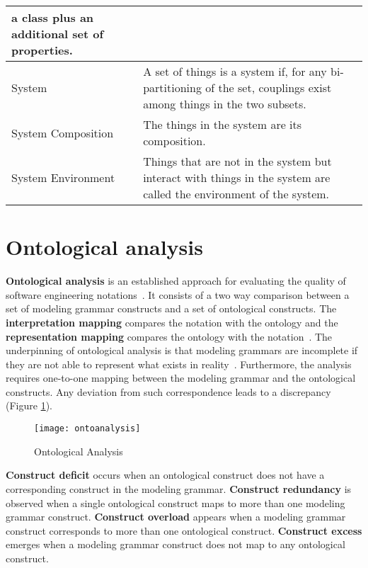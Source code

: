 \begin{center}
\begin{longtable}{ | p{11em} | p{30em} | }
a class plus an additional set of properties.~\cite{weber1996analytical} \\ 
\hline
 System & A set of things is a system if, for any bi-partitioning of the set, couplings exist among things in the two subsets.~\cite{wand1995deep} \\
 \hline
 System Composition & The things in the system are its composition.~\cite{wand1995deep} \\
 \hline
 System Environment &  Things that are not in the system but interact with things in the system are called the environment of the system.~\cite{wand1995deep} \\
 \hline
\end{longtable}
\end{center}


\section{Ontological analysis}

\textbf{Ontological analysis} is an established approach for evaluating the quality of software engineering notations~\cite{moody2009physics}. It consists of a two way comparison between a set of modeling grammar constructs and a set of ontological constructs. The \textbf{interpretation mapping} compares the notation with the ontology and the \textbf{representation mapping} compares the ontology with the notation~\cite{gehlert2007toward}. The underpinning of ontological analysis is that modeling grammars are incomplete if they are not able to represent what exists in reality~\cite{green2000integrated}. Furthermore, the analysis requires one-to-one mapping between the modeling grammar and the ontological constructs. Any deviation from such correspondence leads to a discrepancy (Figure \ref{fig:ontoanalysis}).

\begin{figure}[h!]
  \centering
  \caption{Ontological Analysis~\cite{gehlert2007toward}}
  \label{fig:ontoanalysis}
  \texttt{[image: ontoanalysis]}
\end{figure}

\textbf{Construct deficit} occurs when an ontological construct does not have a corresponding construct in the modeling grammar. \textbf{Construct redundancy} is observed when a single ontological construct maps to more than one modeling grammar construct. \textbf{Construct overload} appears when a modeling grammar construct corresponds to more than one ontological construct. \textbf{Construct excess} emerges when a modeling grammar construct does not map to any ontological construct.~\cite{moody2009physics}

